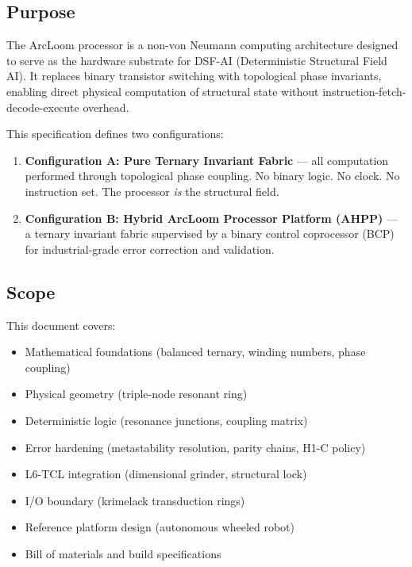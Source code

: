 \documentclass[11pt, a4paper]{article}
\begin{document}
\subsection{Purpose}

The ArcLoom processor is a non-von Neumann computing architecture designed
to serve as the hardware substrate for DSF-AI (Deterministic Structural
Field AI). It replaces binary transistor switching with topological phase
invariants, enabling direct physical computation of structural state
without instruction-fetch-decode-execute overhead.

This specification defines two configurations:
\begin{enumerate}[label=\arabic*.]
  \item \textbf{Configuration A: Pure Ternary Invariant Fabric} ---
        all computation performed through topological phase coupling.
        No binary logic. No clock. No instruction set. The processor
        \textit{is} the structural field.
  \item \textbf{Configuration B: Hybrid ArcLoom Processor Platform (AHPP)} ---
        a ternary invariant fabric supervised by a binary control coprocessor
        (BCP) for industrial-grade error correction and validation.
\end{enumerate}

\subsection{Scope}

This document covers:
\begin{itemize}[nosep]
  \item Mathematical foundations (balanced ternary, winding numbers, phase coupling)
  \item Physical geometry (triple-node resonant ring)
  \item Deterministic logic (resonance junctions, coupling matrix)
  \item Error hardening (metastability resolution, parity chains, H1-C policy)
  \item L6-TCL integration (dimensional grinder, structural lock)
  \item I/O boundary (krimelack transduction rings)
  \item Reference platform design (autonomous wheeled robot)
  \item Bill of materials and build specifications
\end{itemize}
\end{document}
